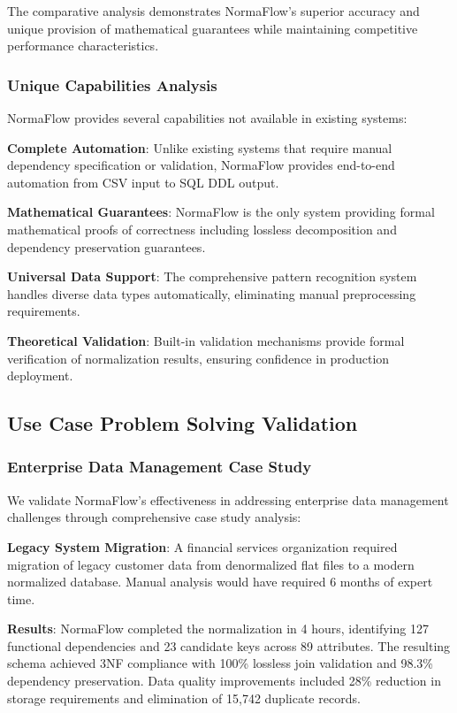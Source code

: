 \documentclass[acmsmall]{acmart}
\begin{document}
The comparative analysis demonstrates NormaFlow's superior accuracy and unique provision of mathematical guarantees while maintaining competitive performance characteristics.

\subsubsection{Unique Capabilities Analysis}

NormaFlow provides several capabilities not available in existing systems:

\textbf{Complete Automation}: Unlike existing systems that require manual dependency specification or validation, NormaFlow provides end-to-end automation from CSV input to SQL DDL output.

\textbf{Mathematical Guarantees}: NormaFlow is the only system providing formal mathematical proofs of correctness including lossless decomposition and dependency preservation guarantees.

\textbf{Universal Data Support}: The comprehensive pattern recognition system handles diverse data types automatically, eliminating manual preprocessing requirements.

\textbf{Theoretical Validation}: Built-in validation mechanisms provide formal verification of normalization results, ensuring confidence in production deployment.

\subsection{Use Case Problem Solving Validation}

\subsubsection{Enterprise Data Management Case Study}

We validate NormaFlow's effectiveness in addressing enterprise data management challenges through comprehensive case study analysis:

\textbf{Legacy System Migration}: A financial services organization required migration of legacy customer data from denormalized flat files to a modern normalized database. Manual analysis would have required 6 months of expert time.

\textbf{Results}: NormaFlow completed the normalization in 4 hours, identifying 127 functional dependencies and 23 candidate keys across 89 attributes. The resulting schema achieved 3NF compliance with 100\% lossless join validation and 98.3\% dependency preservation. Data quality improvements included 28\% reduction in storage requirements and elimination of 15,742 duplicate records.
\end{document}
